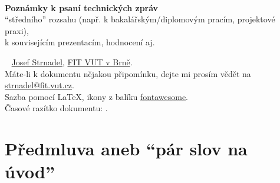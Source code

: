 \documentclass[a4paper,11pt, twoside]{report}
\begin{document}
\pagestyle{myheadings}

\centering

\parbox{10mm}{
\vspace{70mm}
}

\pagestyle{empty}

{\Huge
\scalebox{2.5}{\faPencilSquareO}\\[2mm]
\textbf{Poznámky k psaní technických zpráv}\\[-0mm]
{
\normalsize
``středního'' rozsahu (např. k bakalářským/diplomovým pracím, projektové praxi),}\\[0mm]
{
\normalsize
k souvisejícím prezentacím, hodnocení aj.\\[4mm]
}
}

\vspace{80mm}

\footnotesize
\flushright 
\parbox{2mm}{\vspace{1.5pt}\textsuperscript{\textcopyright}}~
\href{https://www.fit.vut.cz/person/strnadel/}{Josef Strnadel}, 
\href{https://www.fit.vut.cz/}{FIT VUT v Brně}.\\ 
Máte-li k dokumentu nějakou připomínku, dejte mi prosím vědět na \href{mailto:strnadel@fit.vut.cz}{strnadel@fit.vut.cz}.\\[+0mm]
Sazba pomocí \LaTeX{}, ikony z balíku \href{https://www.ctan.org/tex-archive/fonts/fontawesome}{fontawesome}.\\
Časové razítko dokumentu: \pdfcreationdate.  


\pagestyle{empty}

\pagebreak


\pagestyle{fancy}
\renewcommand{\headrulewidth}{0pt}
\renewcommand{\footrulewidth}{0pt}
\fancyhead{} 
\fancyfoot{} 
\fancyfoot[CE,CO]{\scriptsize (\textit{\thepage})}  

\newpage



\chapter*{Předmluva aneb ``pár slov na úvod''}
\end{document}
